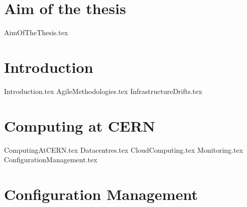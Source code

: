 \documentclass[12pt,a4paper,openright]{report}
\begin{document}

\chapter*{Aim of the thesis}

{AimOfTheThesis.tex}

\tableofcontents
\clearpage{\pagestyle{empty}\cleardoublepage}



\chapter{Introduction}


\fancyfoot{}
\fancyhead[RO,L]{\thepage}
\fancyhead[LO]{\leftmark}
\fancyhead[R]{\rightmark}


{Introduction.tex}
{AgileMethodologies.tex}
{InfrastructureDrifts.tex}

\chapter{Computing at CERN}

{ComputingAtCERN.tex}
{Datacentres.tex}
{CloudComputing.tex}
{Monitoring.tex}
{ConfigurationManagement.tex}

\chapter{Configuration Management}
\end{document}
